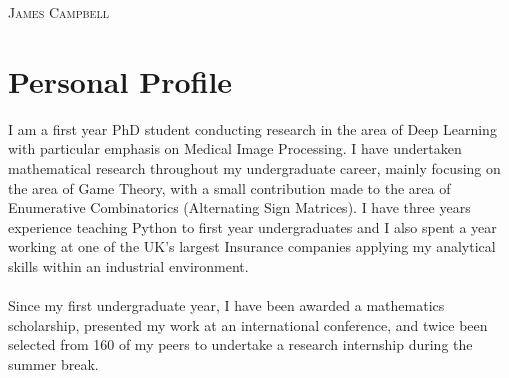 \documentclass[a4paper]{article}
\begin{document}
\pagestyle{empty} %
\begin{multicols}{2}

\raggedright{\textsc{\Huge{James Campbell}}}\\
\columnbreak
{}

\end{multicols}

\section{Personal Profile}
I am a first year PhD student conducting research in the area of Deep Learning with particular emphasis on Medical Image Processing.
I have undertaken mathematical research throughout my undergraduate career, mainly focusing on the area of Game Theory, with a small contribution made to the area of Enumerative Combinatorics (Alternating Sign Matrices).
I have three years experience teaching Python to first year undergraduates and I also spent a year working at one of the UK's largest Insurance companies applying my analytical skills within an industrial environment.\\
\\
Since my first undergraduate year, I have been awarded a mathematics scholarship, presented my work at an international conference, and twice been selected from 160 of my peers to undertake a research internship during the summer break.

\end{document}
